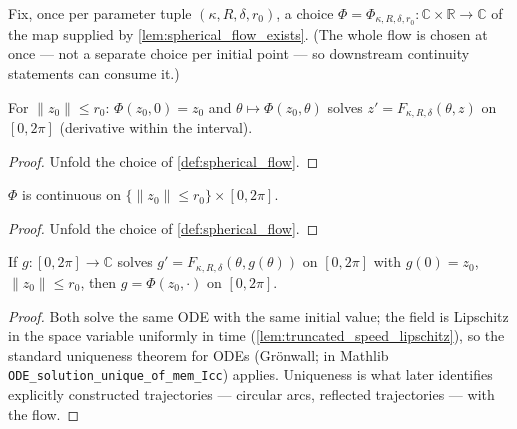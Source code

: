 \begin{definition}

  \label{def:spherical_flow}
  Fix, once per parameter tuple $(\kappa,R,\delta,r_0)$, a choice
  $\Phi=\Phi_{\kappa,R,\delta,r_0}:\mathbb C\times\mathbb R\to\mathbb C$ of the map
  supplied by \cref{lem:spherical_flow_exists}. (The whole flow is chosen at once — not a
  separate choice per initial point — so downstream continuity statements can consume it.)
\end{definition}

\begin{lemma}

  \label{lem:spherical_flow_spec}
  For $\|z_0\|\le r_0$: $\Phi(z_0,0)=z_0$ and $\theta\mapsto\Phi(z_0,\theta)$ solves
  $z'=F_{\kappa,R,\delta}(\theta,z)$ on $[0,2\pi]$ (derivative within the interval).
\end{lemma}

\begin{proof}

\leanok
  Unfold the choice of \cref{def:spherical_flow}.
\end{proof}

\begin{lemma}

  \label{lem:spherical_flow_continuousOn}
  $\Phi$ is continuous on $\{\|z_0\|\le r_0\}\times[0,2\pi]$.
\end{lemma}

\begin{proof}

\leanok
  Unfold the choice of \cref{def:spherical_flow}.
\end{proof}

\begin{lemma}

  \label{lem:spherical_flow_unique}
  If $g:[0,2\pi]\to\mathbb C$ solves $g'=F_{\kappa,R,\delta}(\theta,g(\theta))$ on
  $[0,2\pi]$ with $g(0)=z_0$, $\|z_0\|\le r_0$, then $g=\Phi(z_0,\cdot)$ on $[0,2\pi]$.
\end{lemma}

\begin{proof}

\leanok
  Both solve the same ODE with the same initial value; the field is Lipschitz in the space
  variable uniformly in time (\cref{lem:truncated_speed_lipschitz}), so the standard
  uniqueness theorem for ODEs (Gr\"onwall; in Mathlib
  \texttt{ODE\_solution\_unique\_of\_mem\_Icc}) applies. Uniqueness is what later
  identifies explicitly constructed trajectories — circular arcs, reflected trajectories —
  with the flow.
\end{proof}

